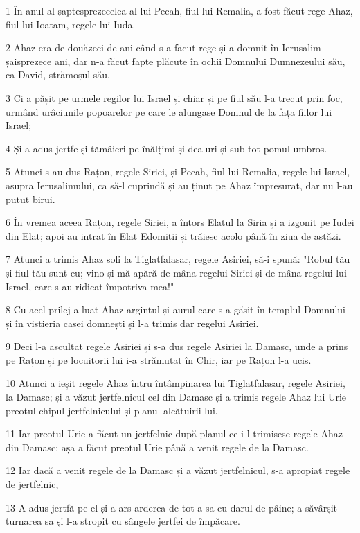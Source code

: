 \par 1 În anul al șaptesprezecelea al lui Pecah, fiul lui Remalia, a fost făcut rege Ahaz, fiul lui Ioatam, regele lui Iuda.
\par 2 Ahaz era de douăzeci de ani când s-a făcut rege și a domnit în Ierusalim șaisprezece ani, dar n-a făcut fapte plăcute în ochii Domnului Dumnezeului său, ca David, strămoșul său,
\par 3 Ci a pășit pe urmele regilor lui Israel și chiar și pe fiul său l-a trecut prin foc, urmând urâciunile popoarelor pe care le alungase Domnul de la fața fiilor lui Israel;
\par 4 Și a adus jertfe și tămâieri pe înălțimi și dealuri și sub tot pomul umbros.
\par 5 Atunci s-au dus Rațon, regele Siriei, și Pecah, fiul lui Remalia, regele lui Israel, asupra Ierusalimului, ca să-l cuprindă și au ținut pe Ahaz împresurat, dar nu l-au putut birui.
\par 6 În vremea aceea Rațon, regele Siriei, a întors Elatul la Siria și a izgonit pe Iudei din Elat; apoi au intrat în Elat Edomiții și trăiesc acolo până în ziua de astăzi.
\par 7 Atunci a trimis Ahaz soli la Tiglatfalasar, regele Asiriei, să-i spună: "Robul tău și fiul tău sunt eu; vino și mă apără de mâna regelui Siriei și de mâna regelui lui Israel, care s-au ridicat împotriva mea!"
\par 8 Cu acel prilej a luat Ahaz argintul și aurul care s-a găsit în templul Domnului și în vistieria casei domnești și l-a trimis dar regelui Asiriei.
\par 9 Deci l-a ascultat regele Asiriei și s-a dus regele Asiriei la Damasc, unde a prins pe Rațon și pe locuitorii lui i-a strămutat în Chir, iar pe Rațon l-a ucis.
\par 10 Atunci a ieșit regele Ahaz întru întâmpinarea lui Tiglatfalasar, regele Asiriei, la Damasc; și a văzut jertfelnicul cel din Damasc și a trimis regele Ahaz lui Urie preotul chipul jertfelnicului și planul alcătuirii lui.
\par 11 Iar preotul Urie a făcut un jertfelnic după planul ce i-l trimisese regele Ahaz din Damasc; așa a făcut preotul Urie până a venit regele de la Damasc.
\par 12 Iar dacă a venit regele de la Damasc și a văzut jertfelnicul, s-a apropiat regele de jertfelnic,
\par 13 A adus jertfă pe el și a ars arderea de tot a sa cu darul de pâine; a săvârșit turnarea sa și l-a stropit cu sângele jertfei de împăcare.
